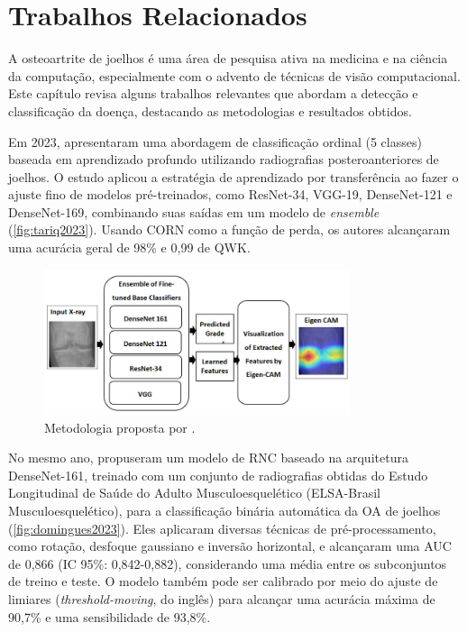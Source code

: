 \chapter{Trabalhos Relacionados}\label{cap:trab_relacionados}

A osteoartrite de joelhos é uma área de pesquisa ativa na medicina e na ciência da computação, especialmente com o advento de técnicas de visão computacional. Este capítulo revisa alguns trabalhos relevantes que abordam a detecção e classificação da doença, destacando as metodologias e resultados obtidos.

Em 2023, \cite{Tariq2023} apresentaram uma abordagem de classificação ordinal (5 classes) baseada em aprendizado profundo utilizando radiografias posteroanteriores de joelhos. O estudo aplicou a estratégia de aprendizado por transferência ao fazer o ajuste fino de modelos pré-treinados, como ResNet-34, VGG-19, DenseNet-121 e DenseNet-169, combinando suas saídas em um modelo de \textit{ensemble} (\autoref{fig:tariq2023}). Usando CORN como a função de perda, os autores alcançaram uma acurácia geral de 98\% e 0,99 de QWK.

\begin{figure}[h]
    \centering
    \includegraphics[width=0.8\textwidth]{figs/tariq2023.png}
    \caption{Metodologia proposta por \cite{Tariq2023}.}
    \label{fig:tariq2023}
\end{figure}

No mesmo ano, \cite{domingues2023} propuseram um modelo de RNC baseado na arquitetura DenseNet-161, treinado com um conjunto de radiografias obtidas do Estudo Longitudinal de Saúde do Adulto Musculoesquelético (ELSA-Brasil Musculoesquelético), para a classificação binária automática da OA de joelhos (\autoref{fig:domingues2023}). Eles aplicaram diversas técnicas de pré-processamento, como rotação, desfoque gaussiano e inversão horizontal, e alcançaram uma AUC de 0,866 (IC 95\%: 0,842-0,882), considerando uma média entre os subconjuntos de treino e teste. O modelo também pode ser calibrado por meio do ajuste de limiares (\textit{threshold-moving}, do inglês) para alcançar uma acurácia máxima de 90,7\% e uma sensibilidade de 93,8\%.

